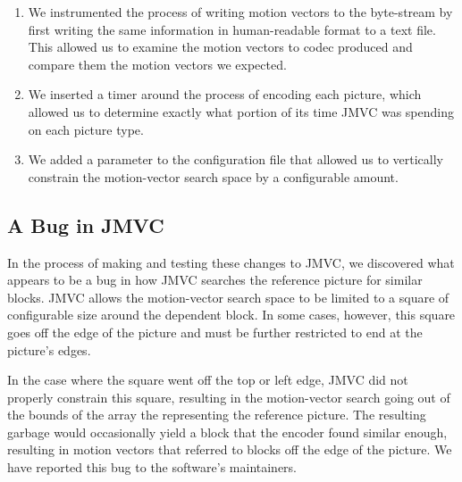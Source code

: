 \documentclass{sig-alternate-05-2015}
\begin{document}
\begin{enumerate}
\item We instrumented the process of writing motion vectors to the byte-stream
by first writing the same information in human-readable format to a text file.
This allowed us to examine the motion vectors to codec produced and compare them
the motion vectors we expected.

\item We inserted a timer around the process of encoding each picture, which
allowed us to determine exactly what portion of its time JMVC was spending on
each picture type.

\item We added a parameter to the configuration file that allowed us to
vertically constrain the motion-vector search space by a configurable amount.
\end{enumerate}

\subsection{A Bug in JMVC}
\label{subsec:bug}
In the process of making and testing these changes to JMVC, we discovered what
appears to be a bug in how JMVC searches the reference picture for similar
blocks. JMVC allows the motion-vector search space to be limited to a square of
configurable size around the dependent block. In some cases, however, this
square goes off the edge of the picture and must be further restricted to end
at the picture's edges.

In the case where the square went off the top or left edge, JMVC did not
properly constrain this square, resulting in the motion-vector search going out
of the bounds of the array the representing the reference picture. The
resulting garbage would occasionally yield a block that the encoder found
similar enough, resulting in motion vectors that referred to blocks off the
edge of the picture. We have reported this bug to the software's maintainers.
\end{document}
